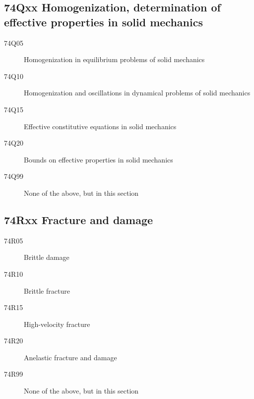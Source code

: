 \subsection*{74Qxx  Homogenization, determination of effective properties in solid mechanics }\label{74Qxx}
\begin{description}  
\item [74Q05]\label{74Q05} Homogenization in equilibrium problems of solid mechanics
\item [74Q10]\label{74Q10} Homogenization and oscillations in dynamical problems  of solid mechanics
\item [74Q15]\label{74Q15} Effective constitutive equations  in solid mechanics
\item [74Q20]\label{74Q20} Bounds on effective properties  in solid mechanics
\item [74Q99]\label{74Q99} None of the above, but in this section
\end{description}
\subsection*{74Rxx  Fracture and damage }\label{74Rxx}
\begin{description}  
\item [74R05]\label{74R05} Brittle damage
\item [74R10]\label{74R10} Brittle fracture
\item [74R15]\label{74R15} High-velocity fracture
\item [74R20]\label{74R20} Anelastic fracture and damage
\item [74R99]\label{74R99} None of the above, but in this section
\end{description}
